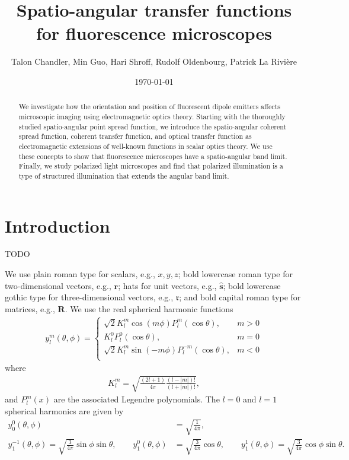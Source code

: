 \documentclass[11pt]{article}
\providecommand{\mb}[1]{\mathbf{#1}}
\begin{document}
\title{\vspace{-2.5em} Spatio-angular transfer functions for fluorescence microscopes\vspace{-1em}}  \author{Talon Chandler, Min Guo, Hari Shroff, Rudolf Oldenbourg, Patrick La Rivi\`ere}
\date{\vspace{-1em}\today\vspace{-1em}}
\maketitle
\begin{abstract}
  We investigate how the orientation and position of fluorescent dipole emitters
  affects microscopic imaging using electromagnetic optics theory. Starting with
  the thoroughly studied spatio-angular point spread function, we introduce the
  spatio-angular coherent spread function, coherent transfer function, and
  optical transfer function as electromagnetic extensions of well-known
  functions in scalar optics theory. We use these concepts to show that
  fluorescence microscopes have a spatio-angular band limit. Finally, we study
  polarized light microscopes and find that polarized illumination is a type of
  structured illumination that extends the angular band limit.
\end{abstract}
\section{Introduction}
TODO

We use plain roman type for scalars, e.g., $x, y, z$; bold lowercase roman type
for two-dimensional vectors, e.g., $\mb{r}$; hats for unit vectors, e.g.,
$\mb{\hat{s}}$; bold lowercase gothic type for three-dimensional vectors, e.g.,
$\mb{\mathfrak{r}}$; and bold capital roman type for matrices, e.g.,
$\mb{R}$. We use the real spherical harmonic functions
\begin{align}
  y_l^m(\theta, \phi) =
  \begin{cases}
    \sqrt{2}K_l^m\cos(m\phi)P_l^m(\cos\theta), & m > 0\\
    K_l^0P_l^0(\cos\theta), & m = 0\\
    \sqrt{2}K_l^m\sin(-m\phi)P_l^{-m}(\cos\theta), & m < 0\\
  \end{cases}
\end{align}
where
\begin{align}
  K_l^m = \sqrt{\frac{(2l+1)}{4\pi}\frac{(l-|m|)!}{(l+|m|)!}},
\end{align}
and $P_l^m(x)$ are the associated Legendre polynomials. The $l=0$ and $l=1$
spherical harmonics are given by
\begin{equation}
\begin{aligned}
  y_0^0(\theta, \phi) &= \sqrt{\frac{1}{4\pi}},\\
  y_1^{-1}(\theta, \phi) = \sqrt{\frac{3}{4\pi}}\sin\phi\sin\theta, \hspace{2em} y_1^0(\theta, \phi) &= \sqrt{\frac{3}{4\pi}}\cos\theta, \hspace{2em} y_1^1(\theta, \phi) = \sqrt{\frac{3}{4\pi}}\cos\phi\sin\theta.
\end{aligned}
\end{equation}
\end{document}

